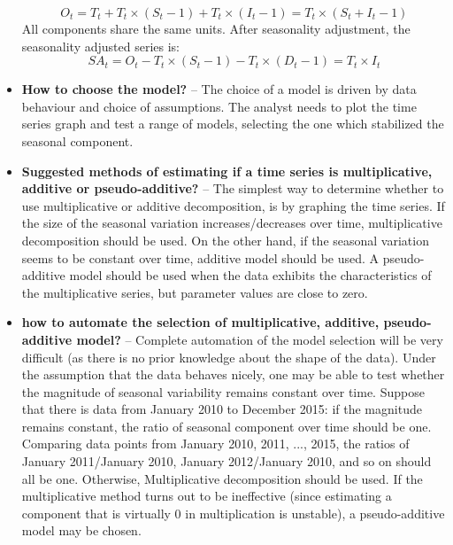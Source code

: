 \begin{itemize}[noitemsep]
    \begin{equation*}
       O_t = T_t + T_t \times (S_t-1) + T_t \times (I_t -1)=T_t \times (S_t +I_t -1)  
    \end{equation*}
    All components share the same units. After seasonality adjustment, the seasonality adjusted series is:
    \begin{equation*}
        SA_t = O_t - T_t \times (S_t -1 )-T_t \times (D_t -1) = T_t \times I_t
    \end{equation*}
    \item \textbf{How to choose the model?} -- The choice of a model is driven by data behaviour and choice of assumptions. The analyst needs to plot the time series graph and test a range of models, selecting the one which stabilized the seasonal component.
    \item \textbf{Suggested methods of estimating if a time series is multiplicative, additive or pseudo-additive?} -- The simplest way to determine whether to use multiplicative or additive decomposition, is by graphing the time series. If the size of the seasonal variation increases/decreases over time, multiplicative decomposition should be used. On the other hand, if the seasonal variation seems to be constant over time, additive model should be used. A pseudo-additive model should be used when the data exhibits the characteristics of the multiplicative series, but parameter values are close to zero.
    \item \textbf{how to automate the selection of multiplicative, additive, pseudo-additive model?} -- Complete automation of the model selection will be very difficult (as there is no prior knowledge about the shape of the data). Under the assumption that the data behaves nicely, one may be able to test whether the magnitude of seasonal variability remains constant over time. Suppose that there is data from January 2010 to December 2015: if the magnitude remains constant, the ratio of seasonal component over time should be one. Comparing data points from January 2010, 2011, ..., 2015, the ratios of January 2011/January 2010, January 2012/January 2010, and so on should all be one. Otherwise, Multiplicative decomposition should be used. If the multiplicative method turns out to be ineffective (since estimating a component that is virtually 0 in multiplication is unstable), a pseudo-additive model may be chosen.
    
    
\end{itemize}



